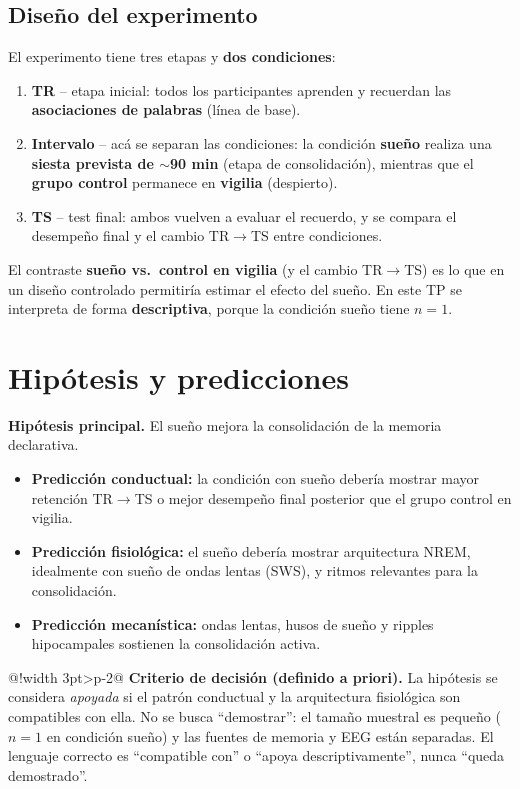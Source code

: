 \documentclass[11pt,a4paper]{article}
\makeatletter
\newcommand{\cajaW}{\dimexpr\linewidth-3pt-2\tabcolsep-1pt\relax}
\newenvironment{clavebox}{%
  \par\smallskip\noindent
  \begin{tabular}{@{}!{\color{amber}\vrule width 3pt}>{\columncolor{amber!10}\color{ink}}p{\cajaW}@{}}}%
  {\end{tabular}\par\smallskip}
\makeatother
\begin{document}
\subsection{Diseño del experimento}
El experimento tiene tres etapas y \textbf{dos condiciones}:
\begin{enumerate}
  \item \textbf{TR} -- etapa inicial: todos los participantes aprenden y recuerdan las
        \textbf{asociaciones de palabras} (línea de base).
  \item \textbf{Intervalo} -- acá se separan las condiciones: la condición \textbf{sueño}
        realiza una \textbf{siesta prevista de $\sim$90 min} (etapa de consolidación), mientras que el
        \textbf{grupo control} permanece en \textbf{vigilia} (despierto).
  \item \textbf{TS} -- test final: ambos vuelven a evaluar el recuerdo, y se compara
        el desempeño final y el cambio TR$\to$TS entre condiciones.
\end{enumerate}
El contraste \textbf{sueño vs.\ control en vigilia} (y el cambio TR$\to$TS) es lo que
en un diseño controlado permitiría estimar el efecto del sueño. En este TP se interpreta
de forma \textbf{descriptiva}, porque la condición sueño tiene $n=1$.

\section{Hipótesis y predicciones}
\textbf{Hipótesis principal.} El sueño mejora la consolidación de la memoria declarativa.

\begin{itemize}
  \item \textbf{Predicción conductual:} la condición con sueño debería mostrar mayor
        retención TR$\to$TS o mejor desempeño final posterior que el grupo control en vigilia.
  \item \textbf{Predicción fisiológica:} el sueño debería mostrar arquitectura NREM,
        idealmente con sueño de ondas lentas (SWS), y ritmos relevantes para la consolidación.
  \item \textbf{Predicción mecanística:} ondas lentas, husos de sueño y ripples
        hipocampales sostienen la consolidación activa.
\end{itemize}

\begin{clavebox}
\textbf{Criterio de decisión (definido a priori).} La hipótesis se considera
\emph{apoyada} si el patrón conductual y la arquitectura fisiológica son compatibles con
ella. No se busca ``demostrar'': el tamaño muestral es pequeño ($n=1$ en condición sueño)
y las fuentes de memoria y EEG están separadas. El lenguaje correcto es ``compatible con''
o ``apoya descriptivamente'', nunca ``queda demostrado''.
\end{clavebox}
\end{document}

